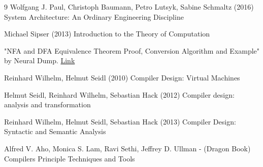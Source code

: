 \documentclass[11pt]{report}
\begin{document}
    
    
    

    \begin{thebibliography}{9}
        Wolfgang J. Paul, Christoph Baumann, Petro Lutsyk, Sabine Schmaltz (2016) System Architecture: An Ordinary Engineering Discipline

        Michael Sipser (2013) Introduction to the Theory of Computation

        "NFA and DFA Equivalence Theorem Proof, Conversion Algorithm and Example"
        by Neural Dump. \href{https://neuraldump.net/2017/11/nfa-and-dfa-equivalence-theorem-proof-and-example/}{Link}

        Reinhard Wilhelm, Helmut Seidl (2010) Compiler Design: Virtual Machines

        Helmut Seidl, Reinhard Wilhelm, Sebastian Hack (2012) Compiler design: analysis and transformation

        Reinhard Wilhelm, Helmut Seidl, Sebastian Hack (2013) Compiler Design: Syntactic and Semantic Analysis

        Alfred V. Aho, Monica S. Lam, Ravi Sethi, Jeffrey D. Ullman - (Dragon Book) Compilers Principle Techniques and Tools
    \end{thebibliography}
\end{document}
